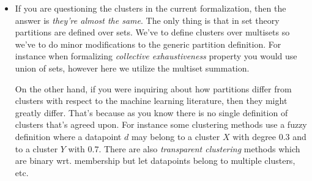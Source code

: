 \documentclass{article}
\begin{document}
\begin{itemize} 
\item {\color{blue} If you are questioning the clusters in the current formalization, then the answer is \emph{they're almost the same}. The only thing is that in set theory partitions are defined over sets. We've to define clusters over multisets so we've to do minor modifications to the generic partition definition. For instance when formalizing \emph{collective exhaustiveness} property you would use union of sets, however here we utilize the multiset summation.

On the other hand, if you were inquiring about how partitions differ from clusters with respect to the machine learning literature, then they might greatly differ. That's because as you know there is no single definition of clusters that's agreed upon. For instance some clustering methods use a fuzzy definition where a datapoint $d$ may belong to a cluster $X$ with degree $0.3$ and to a cluster $Y$ with $0.7$. There are also \emph{transparent  clustering} methods which are binary wrt. membership but let datapoints belong to multiple clusters, etc. 
}
\end{itemize}




\end{document}

